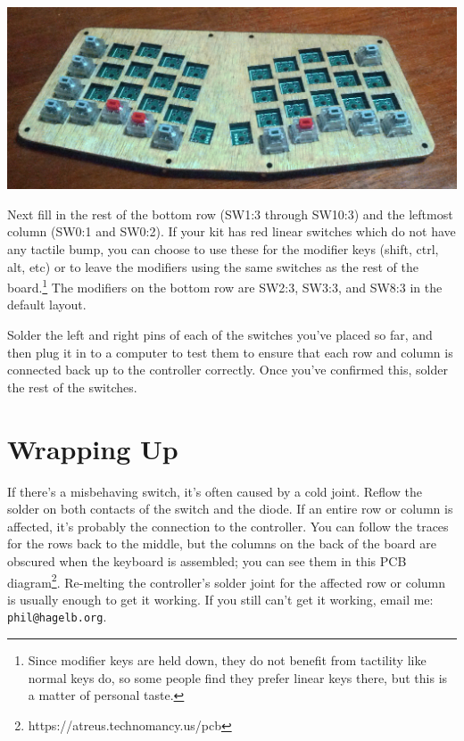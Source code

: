 \documentclass[landscape,twocolumn]{article}
\begin{document}
\vspace{1em}
\begin{center}
  \includegraphics[width=0.9\columnwidth]{some-switches.jpg}
\end{center}
\vspace{1em}

Next fill in the rest of the bottom row (SW1:3 through SW10:3) and the
leftmost column (SW0:1 and SW0:2). If your kit has red linear switches
which do not have any tactile bump, you can choose to use these for
the modifier keys (shift, ctrl, alt, etc) or to leave the modifiers
using the same switches as the rest of the board.\footnote{Since
  modifier keys are held down, they do not benefit from tactility like
  normal keys do, so some people find they prefer linear keys there,
  but this is a matter of personal taste.} The modifiers on the bottom
row are SW2:3, SW3:3, and SW8:3 in the default layout.

\vspace{1em}

Solder the left and right pins of each of the switches you've placed
so far, and then plug it in to a computer to test them to ensure that
each row and column is connected back up to the controller
correctly. Once you've confirmed this, solder the rest of the
switches.

\section{Wrapping Up}

If there's a misbehaving switch, it's often caused by a cold
joint. Reflow the solder on both contacts of the switch and the
diode. If an entire row or column is affected, it's probably the
connection to the controller. You can follow the traces for the rows
back to the middle, but the columns on the back of the board are
obscured when the keyboard is assembled; you can see them in this PCB
diagram\footnote{https://atreus.technomancy.us/pcb}. Re-melting the
controller's solder joint for the affected row or column is usually
enough to get it working. If you still can't
get it working, email me: \texttt{phil@hagelb.org}.
\end{document}

